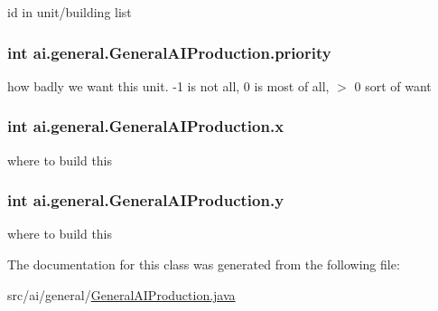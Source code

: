 \label{classai_1_1general_1_1_general_a_i_production_af587890ea032afe2018b3703eba0d644}
id in unit/building list \hypertarget{classai_1_1general_1_1_general_a_i_production_ab2757baddd4d87440339c2df5245bdb9}{
\subsubsection[{priority}]{\setlength{\rightskip}{0pt plus 5cm}int {\bf ai.general.GeneralAIProduction.priority}}}
\label{classai_1_1general_1_1_general_a_i_production_ab2757baddd4d87440339c2df5245bdb9}
how badly we want this unit. -\/1 is not all, 0 is most of all, $>$ 0 sort of want \hypertarget{classai_1_1general_1_1_general_a_i_production_a3c94de84a840dc628a6417ecd25936b2}{
\subsubsection[{x}]{\setlength{\rightskip}{0pt plus 5cm}int {\bf ai.general.GeneralAIProduction.x}}}
\label{classai_1_1general_1_1_general_a_i_production_a3c94de84a840dc628a6417ecd25936b2}
where to build this \hypertarget{classai_1_1general_1_1_general_a_i_production_ae4762a57aa2905a200ffad36cfbdad4e}{
\subsubsection[{y}]{\setlength{\rightskip}{0pt plus 5cm}int {\bf ai.general.GeneralAIProduction.y}}}
\label{classai_1_1general_1_1_general_a_i_production_ae4762a57aa2905a200ffad36cfbdad4e}
where to build this 

The documentation for this class was generated from the following file:\begin{DoxyCompactItemize}
\item 
src/ai/general/\hyperlink{_general_a_i_production_8java}{GeneralAIProduction.java}\end{DoxyCompactItemize}
